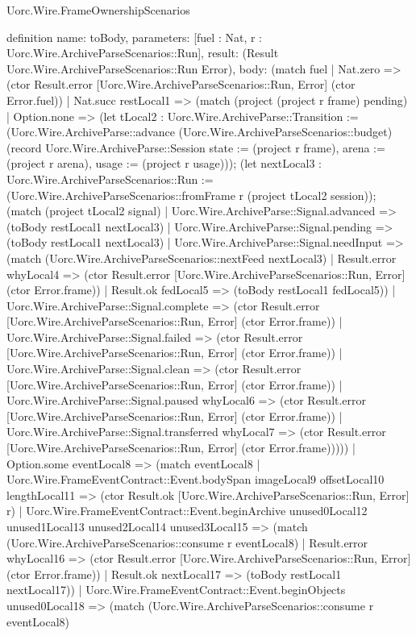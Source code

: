 \begin{lexlean}{Uorc.Wire.FrameOwnershipScenarios}
\begin{semanticmodule}
definition{
  name: toBody,
  parameters: [fuel : Nat, r : Uorc.Wire.ArchiveParseScenarios::Run],
  result: (Result Uorc.Wire.ArchiveParseScenarios::Run Error),
  body: (match fuel
    | Nat.zero => (ctor Result.error [Uorc.Wire.ArchiveParseScenarios::Run, Error] (ctor Error.fuel))
    | Nat.succ restLocal1 => (match (project (project r frame) pending)
      | Option.none => (let tLocal2 : Uorc.Wire.ArchiveParse::Transition := (Uorc.Wire.ArchiveParse::advance (Uorc.Wire.ArchiveParseScenarios::budget) (record Uorc.Wire.ArchiveParse::Session {state := (project r frame), arena := (project r arena), usage := (project r usage)})); (let nextLocal3 : Uorc.Wire.ArchiveParseScenarios::Run := (Uorc.Wire.ArchiveParseScenarios::fromFrame r (project tLocal2 session)); (match (project tLocal2 signal)
        | Uorc.Wire.ArchiveParse::Signal.advanced => (toBody restLocal1 nextLocal3)
        | Uorc.Wire.ArchiveParse::Signal.pending => (toBody restLocal1 nextLocal3)
        | Uorc.Wire.ArchiveParse::Signal.needInput => (match (Uorc.Wire.ArchiveParseScenarios::nextFeed nextLocal3)
          | Result.error whyLocal4 => (ctor Result.error [Uorc.Wire.ArchiveParseScenarios::Run, Error] (ctor Error.frame))
          | Result.ok fedLocal5 => (toBody restLocal1 fedLocal5))
        | Uorc.Wire.ArchiveParse::Signal.complete => (ctor Result.error [Uorc.Wire.ArchiveParseScenarios::Run, Error] (ctor Error.frame))
        | Uorc.Wire.ArchiveParse::Signal.failed => (ctor Result.error [Uorc.Wire.ArchiveParseScenarios::Run, Error] (ctor Error.frame))
        | Uorc.Wire.ArchiveParse::Signal.clean => (ctor Result.error [Uorc.Wire.ArchiveParseScenarios::Run, Error] (ctor Error.frame))
        | Uorc.Wire.ArchiveParse::Signal.paused whyLocal6 => (ctor Result.error [Uorc.Wire.ArchiveParseScenarios::Run, Error] (ctor Error.frame))
        | Uorc.Wire.ArchiveParse::Signal.transferred whyLocal7 => (ctor Result.error [Uorc.Wire.ArchiveParseScenarios::Run, Error] (ctor Error.frame)))))
      | Option.some eventLocal8 => (match eventLocal8
        | Uorc.Wire.FrameEventContract::Event.bodySpan imageLocal9 offsetLocal10 lengthLocal11 => (ctor Result.ok [Uorc.Wire.ArchiveParseScenarios::Run, Error] r)
        | Uorc.Wire.FrameEventContract::Event.beginArchive unused0Local12 unused1Local13 unused2Local14 unused3Local15 => (match (Uorc.Wire.ArchiveParseScenarios::consume r eventLocal8)
          | Result.error whyLocal16 => (ctor Result.error [Uorc.Wire.ArchiveParseScenarios::Run, Error] (ctor Error.frame))
          | Result.ok nextLocal17 => (toBody restLocal1 nextLocal17))
        | Uorc.Wire.FrameEventContract::Event.beginObjects unused0Local18 => (match (Uorc.Wire.ArchiveParseScenarios::consume r eventLocal8)
}
\end{semanticmodule}
\end{lexlean}
